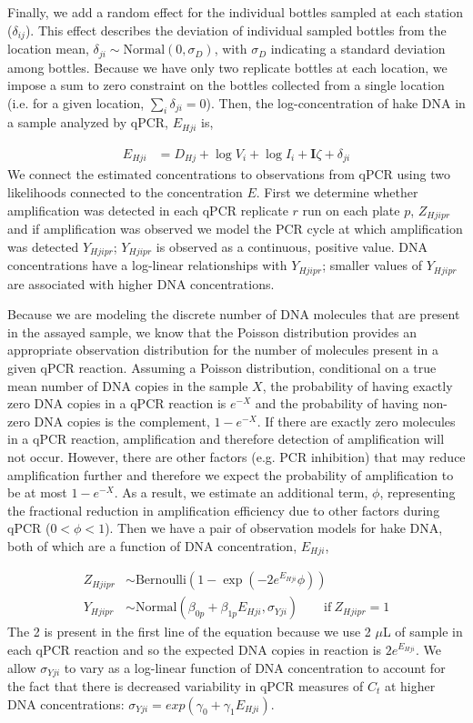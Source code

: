 \documentclass{article}
\begin{document}
Finally, we add a random effect for the individual bottles sampled at each station ($\delta_{ij}$). This effect  describes the deviation of individual sampled bottles from the location mean, $\delta_{ji} \sim  \mathrm{Normal}(0,\sigma_D)$, with $\sigma_D$ indicating a  standard deviation among bottles. Because we have only two replicate bottles at each location, we impose a sum to zero constraint on the bottles collected from a single location (i.e. for a given location, $\sum_i \delta_{ji} = 0$). Then, the log-concentration of hake DNA in a sample analyzed by qPCR, $E_{Hji}$ is, 

\begin{align}
  E_{Hji} &= D_{Hj} +  \log{V_i} + \log{I_i} + \mathbf{I}\zeta + \delta_{ji}
\end{align}
We connect the estimated concentrations to observations from qPCR using two likelihoods connected to the concentration $E$. First we determine whether amplification was detected in each qPCR replicate $r$ run on each plate $p$, $Z_{Hjipr}$ and if amplification was observed we model the PCR cycle at which amplification was detected $Y_{Hjipr}$; $Y_{Hjipr}$ is observed as a continuous, positive value. DNA concentrations have a log-linear relationships with $Y_{Hjipr}$; smaller values of $Y_{Hjipr}$ are associated with higher DNA concentrations. 

Because we are modeling the discrete number of DNA molecules that are present in the assayed sample, we know that the Poisson distribution provides an appropriate observation distribution for the number of molecules present in a given qPCR reaction. Assuming a Poisson distribution, conditional on a true mean number of DNA copies in the sample $X$, the probability of having exactly zero DNA copies in a qPCR reaction is $e^{-X}$ and the probability of having non-zero DNA copies is the complement, $1-e^{-X}$. If there are exactly zero molecules in a qPCR reaction, amplification and therefore detection of amplification will not occur. However, there are other factors (e.g. PCR inhibition) that may reduce amplification further and therefore we expect the probability of amplification to be at most $1-e^{-X}$. As a result, we estimate an additional term, $\phi$, representing the fractional reduction in amplification efficiency due to other factors during qPCR ($0<\phi<1$). Then we have a pair of observation models for hake DNA, both of which are a function of DNA concentration, $E_{Hji}$,

\begin{align}
  Z_{Hjipr} &\sim  \mathrm{Bernoulli} \left(1 - \exp(-2 e^{E_{Hji}}\phi) \right) \\ 
  Y_{Hjipr} &\sim  \mathrm{Normal} \left(\beta_{0p}+\beta_{1p}{E_{Hji}},\sigma_{Yji} \right) \qquad   \mathrm{if} \: Z_{Hjipr} = 1 
\end{align} 
The 2 is present in the first line of the equation because we use 2 $\mu$L of sample in each qPCR reaction and so the expected DNA copies in reaction is $2e^{E_{Hji}}$. We allow $\sigma_{Yji}$ to vary as a log-linear function of DNA concentration to account for the fact that there is decreased variability in qPCR measures of $C_t$ at higher DNA concentrations: $\sigma_{Yji} = exp(\gamma_{0}+\gamma_{1}E_{Hji})$.
\end{document}
